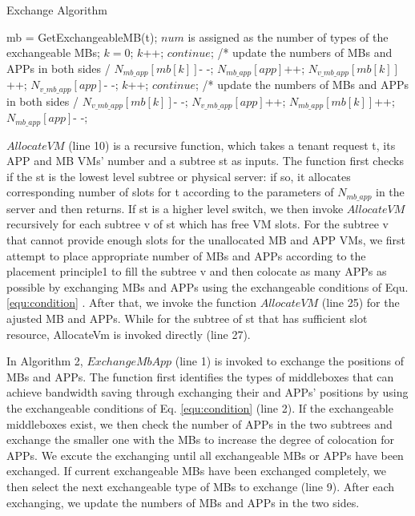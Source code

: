 \documentclass[review]{elsarticle}
\begin{document}
\begin{algorithm}
	\caption{Exchange Algorithm}
	\begin{algorithmic}[1]
	   \State mb = GetExchangeableMB(t);
	       \State $num$ is assigned as the number of types
	       \State of the exchangeable MBs;
	       \State $k = 0$;
				   \State $k$++; $continue$;
			   \EndIf
			   \State /* update the numbers of MBs
			   \State and APPs in both sides \quad \quad*/
			   \State $N_{mb\_app}[mb[k]]$- -; $N_{mb\_app}[app]$++;
		 	   \State $N_{v\_mb\_app}[mb[k]]$++; $N_{v\_mb\_app}[app]$- -;
			\EndWhile
	    \Else
			   \State $k$++; $continue$;
			\EndIf
			\State /* update the numbers of MBs
			\State and APPs in both sides \quad \quad*/
			\State $N_{v\_mb\_app}[mb[k]]$- -; $N_{v\_mb\_app}[app]$++;
			\State $N_{mb\_app}[mb[k]]$++; $N_{mb\_app}[app]$- -;
		 \EndWhile
	   \EndIf
	  \EndIf
   \EndFunction    
  \end{algorithmic}
   
\end{algorithm}		

 $AllocateVM$ (line 10) is a recursive function, which takes a tenant request t, its APP and MB VMs’ number and a subtree st as inputs. The function first checks if the st is the lowest level subtree or physical server: if so, it allocates corresponding number of slots for t according to the parameters of $N_{mb\_app}$ in the server and then returns. If st is a higher level switch, we then invoke $AllocateVM$ recursively for each subtree v of st which has free VM slots. For the subtree v that cannot provide enough slots for the unallocated MB and APP VMs, we first attempt to place appropriate number of MBs and APPs according to the placement principle1 to fill the subtree v and then colocate as many APPs as possible by exchanging MBs and APPs using the exchangeable conditions of Equ. \ref{equ:condition} . After that, we invoke the function $AllocateVM$ (line 25) for the ajusted MB and APPs. While for the subtree of st that has sufficient slot resource, AllocateVm is invoked directly (line 27). 

In Algorithm 2, $ExchangeMbApp$ (line 1) is invoked to exchange the positions of MBs and APPs. The function first identifies the types of middleboxes that can achieve bandwidth saving through exchanging their and APPs' positions by using the exchangeable conditions of Eq. \ref{equ:condition} (line 2). If the exchangeable middleboxes exist, we then check the number of APPs in the two subtrees and exchange the smaller one with the MBs to increase the degree of colocation for APPs. We excute the exchanging until all exchangeable MBs or APPs have been exchanged. If current exchangeable MBs have been exchanged completely, we then select the next exchangeable type of MBs to exchange (line 9). After each exchanging, we update the numbers of MBs and APPs in the two sides.
\end{document}
